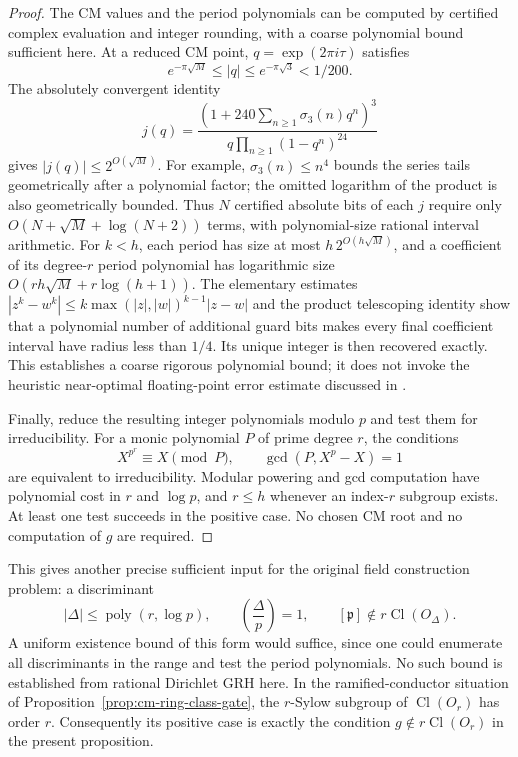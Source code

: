 \documentclass[11pt]{article}
\theoremstyle{definition}
\theoremstyle{remark}
\begin{document}
\begin{proof}
The CM values and the period polynomials can be computed by
certified complex evaluation and integer rounding, with a coarse
polynomial bound sufficient here.
At a reduced CM point,
$q=\exp(2\pi i\tau)$ satisfies
\[
 e^{-\pi\sqrt M}\le |q|\le e^{-\pi\sqrt3}<1/200.
\]
The absolutely convergent identity
\[
 j(q)=\frac{\left(1+240\sum_{n\ge1}\sigma_3(n)q^n\right)^3}
 {q\prod_{n\ge1}(1-q^n)^{24}}
\]
gives $|j(q)|\le 2^{O(\sqrt M)}$.
For example, $\sigma_3(n)\le n^4$ bounds the series tails
geometrically after a polynomial factor; the omitted logarithm
of the product is also geometrically bounded.
Thus $N$ certified absolute bits of each $j$ require only
$O(N+\sqrt M+\log(N+2))$ terms, with polynomial-size rational
interval arithmetic.
For $k<h$, each period has size at most
$h\,2^{O(h\sqrt M)}$, and a coefficient of its degree-$r$
period polynomial has logarithmic size
$O(rh\sqrt M+r\log(h+1))$.
The elementary estimates
$|z^k-w^k|\le k\max(|z|,|w|)^{k-1}|z-w|$
and the product telescoping identity show that a polynomial number
of additional guard bits makes every final coefficient interval
have radius less than $1/4$.
Its unique integer is then recovered exactly.
This establishes a coarse rigorous polynomial bound; it does not
invoke the heuristic near-optimal floating-point error estimate
discussed in \cite[\S1, Corollary~1.3]{Enge2009ClassPolynomials}.

Finally, reduce the resulting integer polynomials modulo $p$ and
test them for irreducibility.
For a monic polynomial $P$ of prime degree $r$, the conditions
\[
 X^{p^r}\equiv X\pmod P,
 \qquad \gcd(P,X^p-X)=1
\]
are equivalent to irreducibility.
Modular powering and gcd computation have polynomial cost in
$r$ and $\log p$, and $r\le h$ whenever an index-$r$ subgroup
exists.  At least one test succeeds in the positive case.
No chosen CM root and no computation of $g$ are required.
\end{proof}

This gives another precise sufficient input for the original field
construction problem: a discriminant
\[
 |\Delta|\le\operatorname{poly}(r,\log p),\qquad
 \left(\frac{\Delta}{p}\right)=1,
 \qquad [\mathfrak p]\notin r\operatorname{Cl}(O_\Delta).
\]
A uniform existence bound of this form would suffice, since one
could enumerate all discriminants in the range and test the period
polynomials.  No such bound is established from rational Dirichlet
GRH here.
In the ramified-conductor situation of
Proposition~\ref{prop:cm-ring-class-gate}, the $r$-Sylow subgroup
of $\operatorname{Cl}(O_r)$ has order $r$.
Consequently its positive case is exactly the condition
$g\notin r\operatorname{Cl}(O_r)$ in the present proposition.
\end{document}
